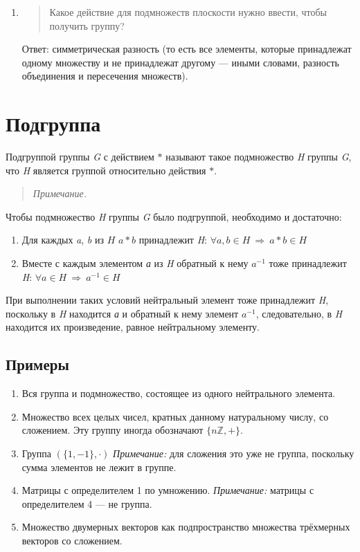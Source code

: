 \documentclass[12pt]{article}
\begin{document}
\begin{enumerate}
    \item
          \begin{quote}
              Какое действие для подмножеств плоскости нужно ввести, чтобы получить
              группу?
          \end{quote}

          Ответ: симметрическая разность (то есть все элементы, которые
          принадлежат одному множеству и не принадлежат другому --- иными словами,
          разность объединения и пересечения множеств).
\end{enumerate}

\section{Подгруппа}

Подгруппой группы \emph{G} с действием $*$ называют такое подмножество
\emph{H} группы \emph{G}, что \emph{H} является группой относительно
действия $*$.

\begin{quote}
    \emph{Примечание.}
\end{quote}

Чтобы подмножество \emph{H} группы \emph{G} было подгруппой, необходимо
и достаточно:

\begin{enumerate}
    \item
          Для каждых \emph{a}, \emph{b} из $H$ $a * b$ принадлежит \emph{H}: $\forall a, b \in H \ \Rightarrow \ a * b \in H$
    \item
          Вместе с каждым элементом \emph{а} из \emph{H} обратный к нему $a^{-1}$ тоже принадлежит \emph{H}: $\forall a \in H \ \Rightarrow \ a^{-1} \in H$
\end{enumerate}

При выполнении таких условий нейтральный элемент тоже принадлежит
\emph{H}, поскольку в \emph{H} находится \emph{а} и обратный к нему
элемент $a^{-1}$, следовательно, в \emph{H} находится их
произведение, равное нейтральному элементу.

\subsection{Примеры}
\begin{enumerate}
    \item
          Вся группа и подмножество, состоящее из одного нейтрального элемента.
    \item
          Множество всех целых чисел, кратных данному натуральному числу, со сложением. Эту группу иногда обозначают $\{n\mathbb{Z}, +\}$.
    \item
          Группа $(\{1, −1\}, \cdot)$ \emph{Примечание:} для сложения это уже не группа, поскольку сумма элементов не лежит в группе.
    \item
          Матрицы с определителем 1 по умножению. \emph{Примечание:} матрицы с
          определителем 4 --- не группа.
    \item
          Множество двумерных векторов как подпространство множества трёхмерных
          векторов со сложением.
\end{enumerate}
\end{document}
